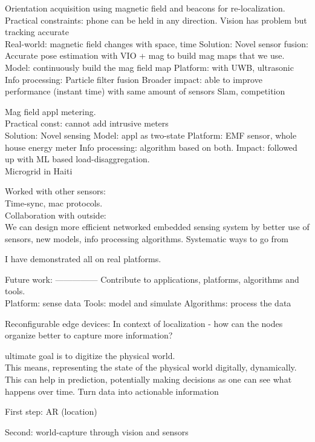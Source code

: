 \documentclass[10pt]{article}
\begin{document}
Orientation acquisition using magnetic field and beacons for re-localization.\\
Practical constraints: phone can be held in any direction. Vision has problem but tracking accurate\\
Real-world: magnetic field changes with space, time
Solution:
Novel sensor fusion: Accurate pose estimation with VIO + mag to build mag maps that we use.\\
Model: continuously build the mag field map
Platform: with UWB, ultrasonic
Info processing: 
Particle filter fusion
Broader impact: 
able to improve performance (instant time) with same amount of sensors
Slam, competition

Mag field appl metering.\\
Practical const: cannot add intrusive meters\\
Solution: Novel sensing
Model: appl as two-state
Platform: EMF sensor, whole house energy meter
Info processing: algorithm based on both.
Impact: followed up with ML based load-disaggregation.\\
Microgrid in Haiti

Worked with other sensors:\\
Time-sync, mac protocols.\\
Collaboration with outside:\\

We can design more efficient networked embedded sensing system by better use of sensors, new models, info processing algorithms. Systematic ways to go from 

I have demonstrated all on real platforms.


Future work: ---------------
Contribute to applications, platforms, algorithms and tools. \\

Platform: sense data
Tools: model and simulate
Algorithms: process the data

Reconfigurable edge devices:
In context of localization - how can the nodes organize better to capture more information?


ultimate goal is to digitize the physical world.\\
This means, representing the state of the physical world digitally, dynamically. This can help in prediction, potentially making decisions as one can see what happens over time.
Turn data into actionable information


First step: AR (location)

Second: world-capture through vision and sensors
\end{document}
